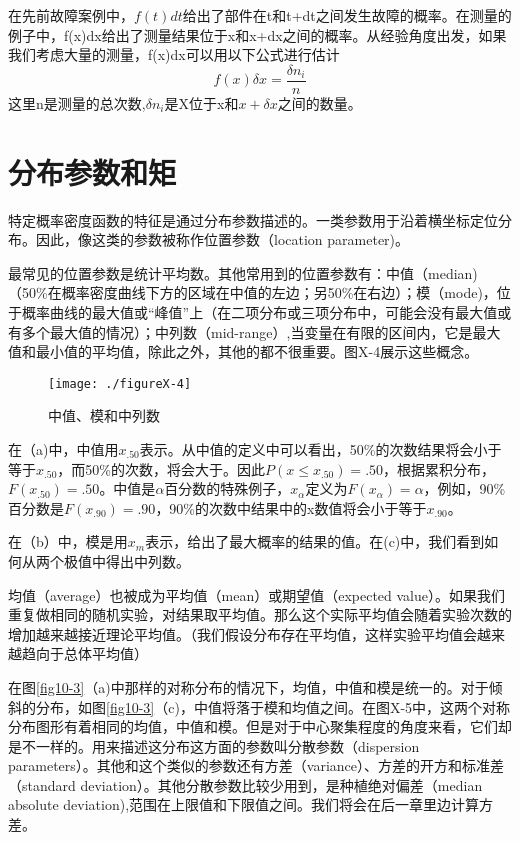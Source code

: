 \documentclass[cn,11pt,chinese]{elegantbook}
\begin{document}
{在先前故障案例中，\(f(t)dt\)给出了部件在t和t+dt之间发生故障的概率。在测量的例子中，f(x)dx给出了测量结果位于x和x+dx之间的概率。从经验角度出发，如果我们考虑大量的测量，f(x)dx可以用以下公式进行估计
\[f(x)\delta x= \frac{\delta n_i}{n}\]
这里n是测量的总次数,\(\delta n_i\)是X位于x和\(x+\delta x\)之间的数量。

\section{分布参数和矩}

特定概率密度函数的特征是通过分布参数描述的。一类参数用于沿着横坐标定位分布。因此，像这类的参数被称作位置参数（location parameter)。

最常见的位置参数是统计平均数。其他常用到的位置参数有：中值（median)（50\%在概率密度曲线下方的区域在中值的左边；另50\%在右边）；模（mode)，位于概率曲线的最大值或“峰值”上（在二项分布或三项分布中，可能会没有最大值或有多个最大值的情况）；中列数（mid-range）,当变量在有限的区间内，它是最大值和最小值的平均值，除此之外，其他的都不很重要。图X-4展示这些概念。

\begin{figure}
	\texttt{[image: ./figureX-4]}
	\caption{中值、模和中列数}
	\label{fig10-4}
\end{figure}


在（a)中，中值用$x_{.50}$表示。从中值的定义中可以看出，50\%的次数结果将会小于等于$x_{.50}$，而50\%的次数，将会大于。因此$P(x\leq x_{.50})=.50$，根据累积分布，$F(x_{.50})=.50$。中值是$\alpha$百分数的特殊例子，$x_\alpha$定义为$F(x_\alpha)=\alpha$，例如，90\%百分数是$F(x_{.90})=.90$，90\%的次数中结果中的x数值将会小于等于$x_{.90}$。

在（b）中，模是用$x_m$表示，给出了最大概率的结果的值。在(c)中，我们看到如何从两个极值中得出中列数。

均值（average）也被成为平均值（mean）或期望值（expected value）。如果我们重复做相同的随机实验，对结果取平均值。那么这个实际平均值会随着实验次数的增加越来越接近理论平均值。（我们假设分布存在平均值，这样实验平均值会越来越趋向于总体平均值）

在图\ref{fig10-3}（a)中那样的对称分布的情况下，均值，中值和模是统一的。对于倾斜的分布，如图\ref{fig10-3}（c)，中值将落于模和均值之间。在图X-5中，这两个对称分布图形有着相同的均值，中值和模。但是对于中心聚集程度的角度来看，它们却是不一样的。用来描述这分布这方面的参数叫分散参数（dispersion parameters）。其他和这个类似的参数还有方差（variance）、方差的开方和标准差（standard deviation）。其他分散参数比较少用到，是种植绝对偏差（median absolute deviation),范围在上限值和下限值之间。我们将会在后一章里边计算方差。

}
\end{document}
